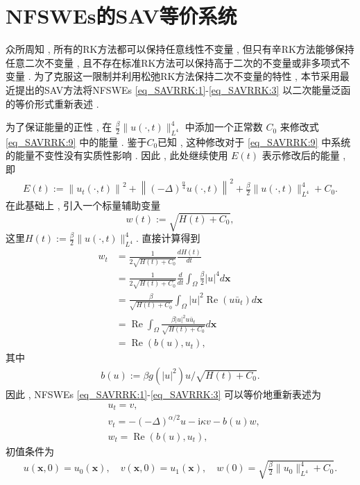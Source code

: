 \section{NFSWEs的SAV等价系统}\label{Section_SAVRRK: 2}

众所周知 , 所有的RK方法都可以保持任意线性不变量 , 但只有辛RK方法能够保持任意二次不变量 , 
且不存在标准RK方法可以保持高于二次的不变量或非多项式不变量 . 
为了克服这一限制并利用松弛RK方法保持二次不变量的特性 , 本节采用最近提出的SAV方法将NFSWEs \eqref{eq_SAVRRK:1}-\eqref{eq_SAVRRK:3} 以二次能量泛函的等价形式重新表述 . 

为了保证能量的正性 , 在 $\frac{\beta}{2}\|u(\cdot , t)\|_{L^{4}}^{4}$ 中添加一个正常数 $C_0$ 来修改式 \eqref{eq_SAVRRK:9} 中的能量 . 
鉴于$C_0$已知 , 这种修改对于 \eqref{eq_SAVRRK:9} 中系统的能量不变性没有实质性影响 . 
因此 , 此处继续使用 $E(t)$ 表示修改后的能量 , 即
\begin{align}\label{eq_SAVRRK:9_1}
	E(t):=\left\|u_{t}(\cdot , t)\right\|^{2}+\left\|(-\Delta)^{\frac{\alpha}{4}} u(\cdot , t)\right\|^{2}+\frac{\beta}{2}\|u(\cdot , t)\|_{L^{4}}^{4} + C_0 . 
\end{align}
在此基础上 , 引入一个标量辅助变量
\begin{equation}
	w(t):=\sqrt{H(t)+C_0} , 
\end{equation}
这里$H(t):=\frac{\beta}{2}\|u(\cdot , t)\|_{L^{4}}^{4}  . $
直接计算得到
\begin{align}
	w_t & =\frac{1}{2 \sqrt{H(t)+C_0}} \frac{d H(t)}{d t} \nonumber\\
	& =\frac{1}{2 \sqrt{H(t)+C_0}} \frac{d}{d t} \int_{\Omega} \frac{\beta}{2}|u|^{4}d \boldsymbol{x} \nonumber\\
	& =\frac{\beta}{\sqrt{H(t)+C_0}} \int_{\Omega} |u|^2 \operatorname{Re}\left(u \bar{u}_t\right) d \boldsymbol{x}\nonumber\\
	& =\operatorname{Re} \int_{\Omega} \frac{\beta|u|^2 u \bar{u}_t}{\sqrt{H(t)+C_0}} d \boldsymbol{x} \nonumber\\
	& =\operatorname{Re}\left(b(u) , u_t\right) , \label{eq_SAVRRK:2-1}
\end{align}
其中
\begin{align}
b(u):=\beta g(|u|^2) u / \sqrt{H(t)+C_0} . 
\end{align}
因此 , NFSWEs \eqref{eq_SAVRRK:1}-\eqref{eq_SAVRRK:3} 可以等价地重新表述为
\begin{align}
& u_t=v , \label{eq_SAVRRK:2-2}\\
& v_t=-(-\Delta)^{\alpha / 2} u-\mathrm{i}\kappa v-b(u) w , \label{eq_SAVRRK:2-3}\\
& w_t=\operatorname{Re}\left(b(u) , u_t\right) , \label{eq_SAVRRK:2-4}
\end{align}
初值条件为
\begin{align}\label{eq_SAVRRK:31}
	u(\boldsymbol{x} , 0)=u_{0}(\boldsymbol{x}) , \quad v(\boldsymbol{x} , 0)=u_{1}(\boldsymbol{x}) , \quad w(0)=\sqrt{\frac{\beta}{2}\|u_{0}\|_{L^{4}}^{4} +C_0} . 
\end{align}

